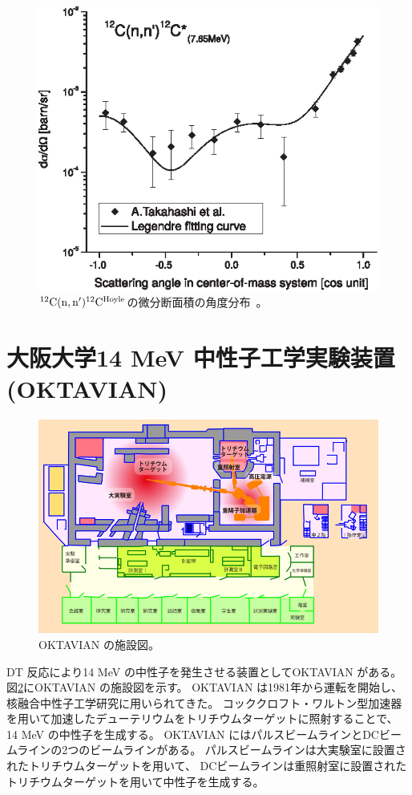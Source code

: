 \begin{figure}
  \centering
  \includegraphics[clip, width=0.6\columnwidth]{eps/cross_section_12C_n_n_12C_7.65.eps}
  \caption[${}^{12}{\rm C}({\rm n},{\rm n}'){}^{12}{\rm C}^{\rm Hoyle}$の微分断面積の角度分布。]
          {${}^{12}{\rm C}({\rm n},{\rm n}'){}^{12}{\rm C}^{\rm Hoyle}$の微分断面積の角度分布~\cite{kondoetal}。}
  \label{fig::sig_angle_dist}
\end{figure}

\section{大阪大学14 MeV 中性子工学実験装置 (OKTAVIAN)}
\begin{figure}
  \centering
  \includegraphics[clip, width=0.9\columnwidth]{pic/oktavian-sketch.png}
  \caption{OKTAVIAN の施設図。}
  \label{pic::oktavian-sketch}
\end{figure}
DT 反応により14 MeV の中性子を発生させる装置としてOKTAVIAN がある。
図\ref{pic::oktavian-sketch}にOKTAVIAN の施設図を示す。
OKTAVIAN は1981年から運転を開始し、核融合中性子工学研究に用いられてきた。
コッククロフト・ワルトン型加速器を用いて加速したデューテリウムをトリチウムターゲットに照射することで、
14 MeV の中性子を生成する。
OKTAVIAN にはパルスビームラインとDCビームラインの2つのビームラインがある。
パルスビームラインは大実験室に設置されたトリチウムターゲットを用いて、
DCビームラインは重照射室に設置されたトリチウムターゲットを用いて中性子を生成する。

